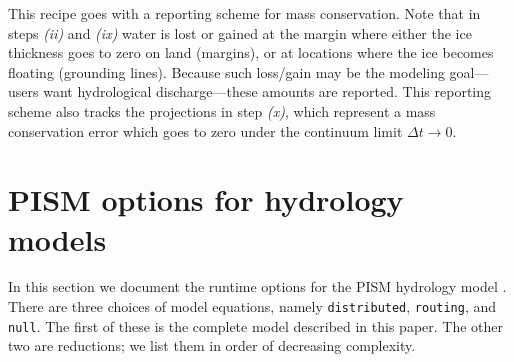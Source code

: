 \documentclass[gmd]{copernicus}   %
\begin{document}
\medskip
This recipe goes with a reporting scheme for mass conservation.  Note that in steps \emph{(ii)} and \emph{(ix)} water is lost or gained at the margin where either the ice thickness goes to zero on land (margins), or at locations where the ice becomes floating (grounding lines).  Because such loss/gain may be the modeling goal---users want hydrological discharge---these amounts are reported.  This reporting scheme also tracks the projections in step \emph{(x)}, which represent a mass conservation error which goes to zero under the continuum limit $\Delta t\to 0$.


\section{PISM options for hydrology models} \label{sec:pismdoc}

In this section we document the runtime options for the PISM hydrology model \citep{pism-user-manual}.  There are three choices of model equations, namely \texttt{distributed}, \texttt{routing}, and \texttt{null}.  The first of these is the complete model described in this paper.  The other two are reductions; we list them in order of decreasing complexity.
\end{document}
